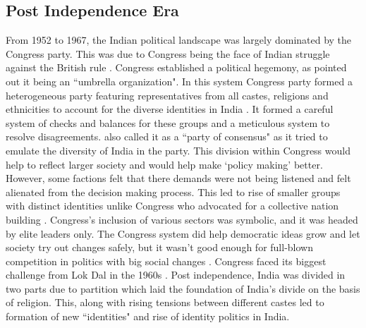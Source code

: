 \begin{sloppypar}
\subsection{Post Independence Era}
 From 1952 to 1967, the Indian political landscape was largely dominated by the Congress party. This was due to Congress being the face of Indian struggle against the British rule \citep{shastri1991nehru}. Congress established a political hegemony, as \cite{kothari1967india} pointed out it being an ``umbrella organization". In this system Congress party formed a  heterogeneous party featuring representatives from all castes, religions and ethnicities to account for the diverse identities in India \citep{anand2015downfall}. It formed a careful system of checks and balances for these groups and a meticulous system to resolve disagreements. \cite{kothari1967india} also called it as a ``party of consensus" as it tried to emulate the diversity of India in the party. This division within Congress would help to reflect larger society and would help make `policy making'  better. However, some factions felt that there demands were not being listened and felt alienated from the decision making process. This led to rise of smaller groups with distinct identities unlike Congress who advocated for a collective nation building \citep{shastri2003continuity}.  Congress’s inclusion of various sectors was symbolic, and it was headed by elite leaders only. The Congress system did help democratic ideas grow and let society try out changes safely, but it wasn’t good enough for full-blown competition in politics with big social changes \citep{shastri2009electoral}. Congress faced its biggest challenge from Lok Dal in the 1960s \citep{desouza2006india}. Post independence, India was divided in two parts due to partition which laid the foundation of India's divide on the basis of religion. This, along with rising tensions between different castes led to formation of new ``identities" and rise of identity politics in India. 


\end{sloppypar}
